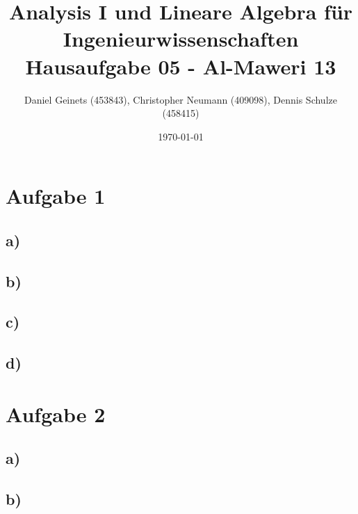 \documentclass[a4paper, 11pt]{article}
\author{Daniel Geinets (453843), Christopher Neumann (409098), Dennis Schulze (458415)}
\date{\today}
\title{Analysis I und Lineare Algebra für Ingenieurwissenschaften \large  \\ Hausaufgabe 05 - Al-Maweri 13}
\begin{document}
\maketitle
\tableofcontents

\setcounter{secnumdepth}{0}
\newcommand{\tuple}[1]{\left(#1\right)}
\renewcommand{\cfrac}[3]{#1 \tuple{\frac{#2}{#3}}}
\newcommand{\R}{\mathbb{R}}
\newcommand{\Z}{\mathbb{Z}}
\newcommand{\Q}{\mathbb{Q}}
\newcommand{\N}{\mathbb{N}}
\newcommand{\C}{\mathbb{C}}

\makeatletter
\renewcommand*\env@matrix[1][*\c@MaxMatrixCols c]{%
\hskip -\arraycolsep
\let\@ifnextchar\new@ifnextchar
\array{#1}}
\makeatother

\pagebreak

\section{Aufgabe 1}
\label{sec:orgd29aaba}
\subsection{a)}
\label{sec:org0ef9314}

\subsection{b)}
\label{sec:orgaafb8b8}

\subsection{c)}
\label{sec:org1f5aa9e}

\subsection{d)}
\label{sec:orgc5c753e}

\section{Aufgabe 2}
\label{sec:orgf6977bf}
\subsection{a)}
\label{sec:org022020c}

\subsection{b)}
\label{sec:org6a93f7b}
\end{document}
